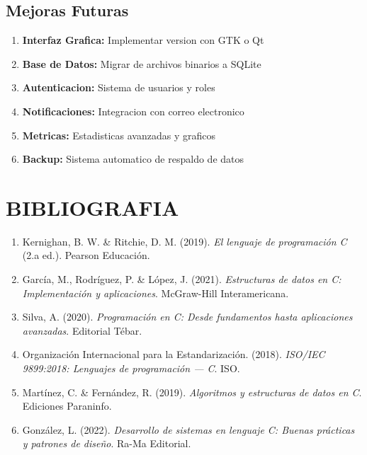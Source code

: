 \documentclass[12pt, a4paper]{article}
\begin{document}
\subsection{Mejoras Futuras}
\begin{enumerate}[left=0pt]
\item \textbf{Interfaz Grafica:} Implementar version con GTK o Qt
\item \textbf{Base de Datos:} Migrar de archivos binarios a SQLite
\item \textbf{Autenticacion:} Sistema de usuarios y roles
\item \textbf{Notificaciones:} Integracion con correo electronico
\item \textbf{Metricas:} Estadisticas avanzadas y graficos
\item \textbf{Backup:} Sistema automatico de respaldo de datos
\end{enumerate}

\section{BIBLIOGRAFIA}

\begin{enumerate}
\item Kernighan, B. W. \& Ritchie, D. M. (2019). \textit{El lenguaje de programación C} (2.a ed.). Pearson Educación.

\item García, M., Rodríguez, P. \& López, J. (2021). \textit{Estructuras de datos en C: Implementación y aplicaciones}. McGraw-Hill Interamericana.

\item Silva, A. (2020). \textit{Programación en C: Desde fundamentos hasta aplicaciones avanzadas}. Editorial Tébar.

\item Organización Internacional para la Estandarización. (2018). \textit{ISO/IEC 9899:2018: Lenguajes de programación — C}. ISO.

\item Martínez, C. \& Fernández, R. (2019). \textit{Algoritmos y estructuras de datos en C}. Ediciones Paraninfo.

\item González, L. (2022). \textit{Desarrollo de sistemas en lenguaje C: Buenas prácticas y patrones de diseño}. Ra-Ma Editorial.
\end{enumerate}
\end{document}
